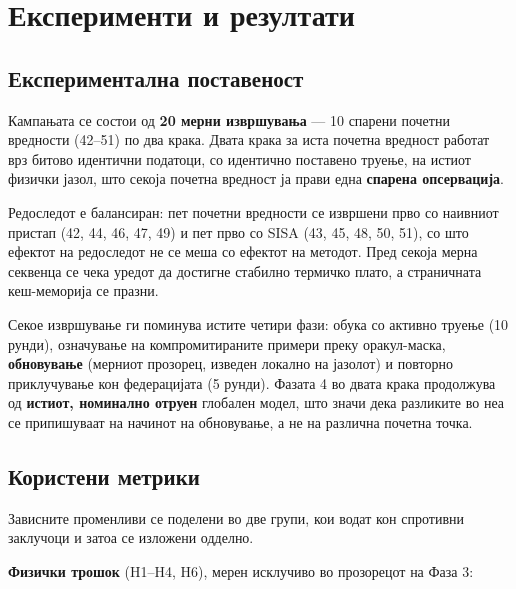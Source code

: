 \chapter{Експерименти и резултати}
\label{chap:results}

\section{Експериментална поставеност}

Кампањата се состои од \textbf{20 мерни извршувања} --- 10 спарени почетни вредности (42–51) по
два крака. Двата крака за иста почетна вредност работат врз битово идентични податоци, со
идентично поставено труење, на истиот физички јазол, што секоја почетна вредност ја прави
една \textbf{спарена опсервација}.

Редоследот е балансиран: пет почетни вредности се извршени прво со наивниот пристап
(42, 44, 46, 47, 49) и пет прво со SISA (43, 45, 48, 50, 51), со што ефектот на редоследот
не се меша со ефектот на методот. Пред секоја мерна секвенца се чека уредот да достигне
стабилно термичко плато, а страничната кеш-меморија се празни.

Секое извршување ги поминува истите четири фази: обука со активно труење (10 рунди),
означување на компромитираните примери преку оракул-маска, \textbf{обновување} (мерниот прозорец,
изведен локално на јазолот) и повторно приклучување кон федерацијата (5 рунди). Фазата 4 во
двата крака продолжува од \textbf{истиот, номинално отруен} глобален модел, што значи дека
разликите во неа се припишуваат на начинот на обновување, а не на различна почетна точка.

\section{Користени метрики}

Зависните променливи се поделени во две групи, кои водат кон спротивни заклучоци и затоа се
изложени одделно.

\textbf{Физички трошок} (H1–H4, H6), мерен исклучиво во прозорецот на Фаза 3:

